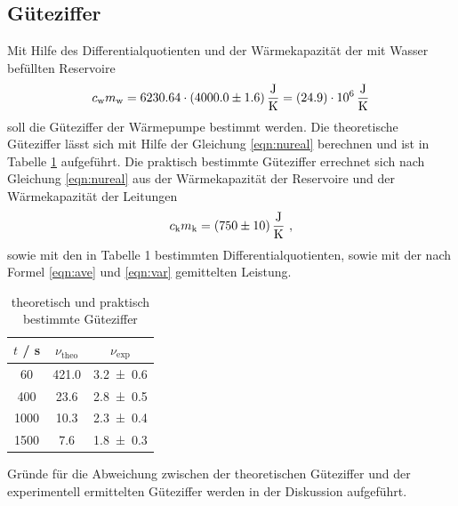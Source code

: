 \subsection{Güteziffer}
Mit Hilfe des Differentialquotienten und der Wärmekapazität der mit Wasser befüllten Reservoire
\begin{equation}
  c_\text{w} m_\text{w} = 6230.64 \cdot (\num{4000 +- 1.6}) \, \frac{\text{J}}{\text{K}} = (\num{24.9 +- 0.0}) \cdot 10^6 \, \frac{\text{J}}{\text{K}}
  \label{eqn:WC}
\end{equation}
soll die Güteziffer der Wärmepumpe bestimmt werden. Die theoretische Güteziffer lässt sich mit Hilfe der Gleichung \ref{eqn:nureal} berechnen und ist in Tabelle \ref{tab:gueteziffer} aufgeführt. Die praktisch bestimmte Güteziffer errechnet sich nach Gleichung \ref{eqn:nureal} aus der Wärmekapazität der Reservoire und der Wärmekapazität der Leitungen
\begin{equation}
  c_\text{k} m_\text{k} = (\num{750 +- 10}) \, \frac{\text{J}}{\text{K}} \ ,
  \label{eqn:Res}
\end{equation}
sowie mit den in Tabelle 1 bestimmten Differentialquotienten, sowie mit der nach Formel \ref{eqn:ave} und \ref{eqn:var} gemittelten Leistung.
\begin{table}
  \centering
  \begin{tabular}{c c c}
    \toprule
    $t$ / s & $\nu_\text{theo}$ & $\nu_\text{exp}$ \\
    \midrule
    60	 & 421.0 & \num{3.2 +- 0.6} 	\\
    400  & 23.6	 & \num{2.8 +- 0.5} 	\\
    1000 & 10.3	 & \num{2.3 +- 0.4}	\\
    1500 & 7.6	 & \num{1.8 +- 0.3} 	\\
    \bottomrule
  \end{tabular}
  \caption{theoretisch und praktisch bestimmte Güteziffer}
  \label{tab:gueteziffer}
\end{table}
Gründe für die Abweichung zwischen der theoretischen Güteziffer und der experimentell ermittelten Güteziffer werden in der Diskussion aufgeführt.
